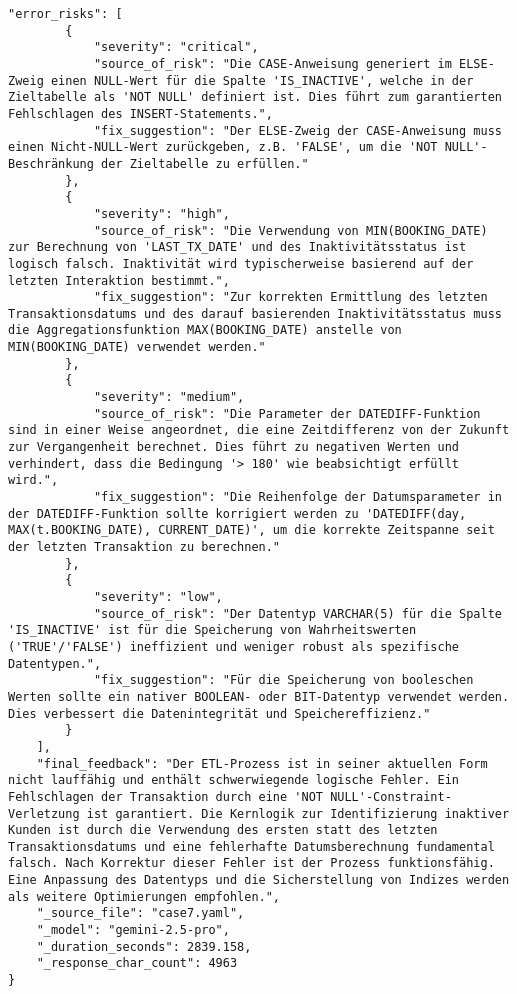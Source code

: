 \begin{lstlisting}[caption={Ausgabe: Gemini 2.5 Pro Anwendungsfall 7 Robustheitsdurchlauf},label={gemini_case7_prompt3}]
    "error_risks": [
        {
            "severity": "critical",
            "source_of_risk": "Die CASE-Anweisung generiert im ELSE-Zweig einen NULL-Wert für die Spalte 'IS_INACTIVE', welche in der Zieltabelle als 'NOT NULL' definiert ist. Dies führt zum garantierten Fehlschlagen des INSERT-Statements.",
            "fix_suggestion": "Der ELSE-Zweig der CASE-Anweisung muss einen Nicht-NULL-Wert zurückgeben, z.B. 'FALSE', um die 'NOT NULL'-Beschränkung der Zieltabelle zu erfüllen."
        },
        {
            "severity": "high",
            "source_of_risk": "Die Verwendung von MIN(BOOKING_DATE) zur Berechnung von 'LAST_TX_DATE' und des Inaktivitätsstatus ist logisch falsch. Inaktivität wird typischerweise basierend auf der letzten Interaktion bestimmt.",
            "fix_suggestion": "Zur korrekten Ermittlung des letzten Transaktionsdatums und des darauf basierenden Inaktivitätsstatus muss die Aggregationsfunktion MAX(BOOKING_DATE) anstelle von MIN(BOOKING_DATE) verwendet werden."
        },
        {
            "severity": "medium",
            "source_of_risk": "Die Parameter der DATEDIFF-Funktion sind in einer Weise angeordnet, die eine Zeitdifferenz von der Zukunft zur Vergangenheit berechnet. Dies führt zu negativen Werten und verhindert, dass die Bedingung '> 180' wie beabsichtigt erfüllt wird.",
            "fix_suggestion": "Die Reihenfolge der Datumsparameter in der DATEDIFF-Funktion sollte korrigiert werden zu 'DATEDIFF(day, MAX(t.BOOKING_DATE), CURRENT_DATE)', um die korrekte Zeitspanne seit der letzten Transaktion zu berechnen."
        },
        {
            "severity": "low",
            "source_of_risk": "Der Datentyp VARCHAR(5) für die Spalte 'IS_INACTIVE' ist für die Speicherung von Wahrheitswerten ('TRUE'/'FALSE') ineffizient und weniger robust als spezifische Datentypen.",
            "fix_suggestion": "Für die Speicherung von booleschen Werten sollte ein nativer BOOLEAN- oder BIT-Datentyp verwendet werden. Dies verbessert die Datenintegrität und Speichereffizienz."
        }
    ],
    "final_feedback": "Der ETL-Prozess ist in seiner aktuellen Form nicht lauffähig und enthält schwerwiegende logische Fehler. Ein Fehlschlagen der Transaktion durch eine 'NOT NULL'-Constraint-Verletzung ist garantiert. Die Kernlogik zur Identifizierung inaktiver Kunden ist durch die Verwendung des ersten statt des letzten Transaktionsdatums und eine fehlerhafte Datumsberechnung fundamental falsch. Nach Korrektur dieser Fehler ist der Prozess funktionsfähig. Eine Anpassung des Datentyps und die Sicherstellung von Indizes werden als weitere Optimierungen empfohlen.",
    "_source_file": "case7.yaml",
    "_model": "gemini-2.5-pro",
    "_duration_seconds": 2839.158,
    "_response_char_count": 4963
}
\end{lstlisting}

